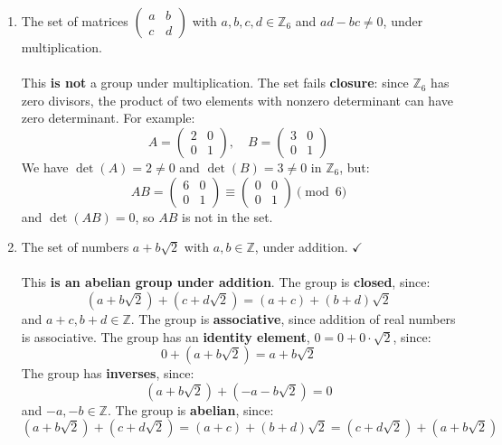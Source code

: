 \documentclass{article}
\newcommand{\Z}{\mathbb{Z}}
\newcommand{\Zn}[1]{\mathbb{Z}_{#1}}
\begin{document}
\begin{enumerate}
\begin{enumerate}
            \item The set of matrices $\begin{pmatrix} a & b \\ c & d \end{pmatrix}$ with $a,b,c,d \in \Zn{6}$ and $ad-bc \neq 0$, under multiplication.
            \\
            \\ This \textbf{is not} a group under multiplication. The set fails \textbf{closure}: since $\Zn{6}$ has zero divisors, the product of two elements with nonzero determinant can have zero determinant. For example:
            \[
                A = \begin{pmatrix} 2 & 0 \\ 0 & 1 \end{pmatrix}, \quad B = \begin{pmatrix} 3 & 0 \\ 0 & 1 \end{pmatrix}
            \]
            We have $\det(A)=2\neq 0$ and $\det(B)=3\neq 0$ in $\Zn{6}$, but:
            \[
                AB = \begin{pmatrix} 6 & 0 \\ 0 & 1 \end{pmatrix} \equiv \begin{pmatrix} 0 & 0 \\ 0 & 1 \end{pmatrix} \pmod{6}
            \]
            and $\det(AB) = 0$, so $AB$ is not in the set.

            \item The set of numbers $a + b\sqrt{2}$ with $a,b \in \Z$, under addition. $\checkmark$
            \\
            \\ This \textbf{is an abelian group under addition}. The group is \textbf{closed}, since:
            \[
                (a + b\sqrt{2}) + (c + d\sqrt{2}) = (a+c) + (b+d)\sqrt{2}
            \]
            and $a+c, b+d \in \Z$. The group is \textbf{associative}, since addition of real numbers is associative. The group has an \textbf{identity element}, $0 = 0 + 0\cdot\sqrt{2}$, since:
            \[
                0 + (a + b\sqrt{2}) = a + b\sqrt{2}
            \]
            The group has \textbf{inverses}, since:
            \[
                (a + b\sqrt{2}) + (-a - b\sqrt{2}) = 0
            \]
            and $-a,-b \in \Z$. The group is \textbf{abelian}, since:
            \[
                (a + b\sqrt{2}) + (c + d\sqrt{2}) = (a+c)+(b+d)\sqrt{2} = (c + d\sqrt{2}) + (a + b\sqrt{2})
            \]


\end{enumerate}
\end{enumerate}
\end{document}
